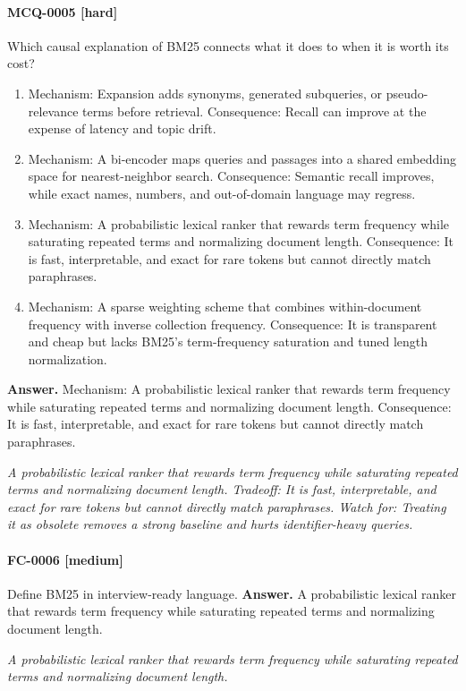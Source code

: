 \paragraph{MCQ-0005 [hard]} Which causal explanation of BM25 connects what it does to when it is worth its cost?
\begin{enumerate}[label=\Alph*.]
\item Mechanism: Expansion adds synonyms, generated subqueries, or pseudo-relevance terms before retrieval. Consequence: Recall can improve at the expense of latency and topic drift.
\item Mechanism: A bi-encoder maps queries and passages into a shared embedding space for nearest-neighbor search. Consequence: Semantic recall improves, while exact names, numbers, and out-of-domain language may regress.
\item Mechanism: A probabilistic lexical ranker that rewards term frequency while saturating repeated terms and normalizing document length. Consequence: It is fast, interpretable, and exact for rare tokens but cannot directly match paraphrases.
\item Mechanism: A sparse weighting scheme that combines within-document frequency with inverse collection frequency. Consequence: It is transparent and cheap but lacks BM25's term-frequency saturation and tuned length normalization.
\end{enumerate}
\noindent\textbf{Answer.} Mechanism: A probabilistic lexical ranker that rewards term frequency while saturating repeated terms and normalizing document length. Consequence: It is fast, interpretable, and exact for rare tokens but cannot directly match paraphrases.
\par\textit{A probabilistic lexical ranker that rewards term frequency while saturating repeated terms and normalizing document length. Tradeoff: It is fast, interpretable, and exact for rare tokens but cannot directly match paraphrases. Watch for: Treating it as obsolete removes a strong baseline and hurts identifier-heavy queries.}
\paragraph{FC-0006 [medium]} Define BM25 in interview-ready language.
\noindent\textbf{Answer.} A probabilistic lexical ranker that rewards term frequency while saturating repeated terms and normalizing document length.
\par\textit{A probabilistic lexical ranker that rewards term frequency while saturating repeated terms and normalizing document length.}
